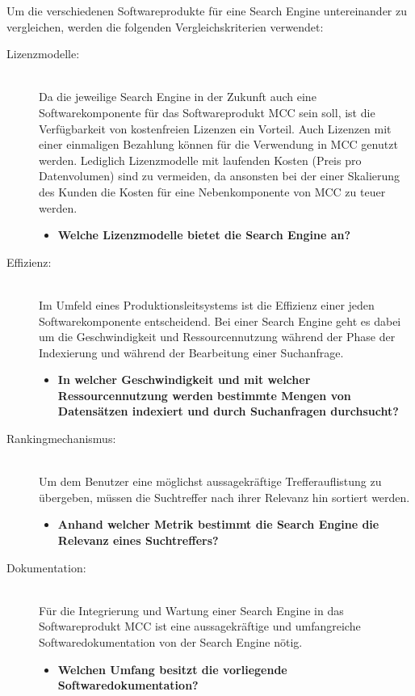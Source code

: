 Um die verschiedenen Softwareprodukte für eine Search Engine untereinander zu vergleichen, werden die folgenden Vergleichskriterien verwendet:

\begin{description}
    \item[Lizenzmodelle:]\hfill \\
    Da die jeweilige Search Engine in der Zukunft auch eine Softwarekomponente für das Softwareprodukt MCC sein soll, ist die Verfügbarkeit von kostenfreien Lizenzen ein Vorteil. Auch Lizenzen mit einer einmaligen Bezahlung können für die Verwendung in MCC genutzt werden. Lediglich Lizenzmodelle mit laufenden Kosten (Preis pro Datenvolumen) sind zu vermeiden, da ansonsten bei der einer Skalierung des Kunden die Kosten für eine Nebenkomponente von MCC zu teuer werden.
    
    \begin{itemize}
        \item \textbf{Welche Lizenzmodelle bietet die Search Engine an?}
    \end{itemize}

    \item[Effizienz:]\hfill \\
    Im Umfeld eines Produktionsleitsystems ist die Effizienz einer jeden Softwarekomponente entscheidend. Bei einer Search Engine geht es dabei um die Geschwindigkeit und Ressourcennutzung während der Phase der Indexierung und während der Bearbeitung einer Suchanfrage.

    \begin{itemize}
        \item \textbf{In welcher Geschwindigkeit und mit welcher Ressourcennutzung werden bestimmte Mengen von Datensätzen indexiert und durch Suchanfragen durchsucht?}
    \end{itemize}
    
    \item[Rankingmechanismus:]\hfill \\
    Um dem Benutzer eine möglichst aussagekräftige Trefferauflistung zu übergeben, müssen die Suchtreffer nach ihrer Relevanz hin sortiert werden.

    \begin{itemize}
        \item \textbf{Anhand welcher Metrik bestimmt die Search Engine die Relevanz eines Suchtreffers?}
    \end{itemize}

    \item[Dokumentation:]\hfill \\
    Für die Integrierung und Wartung einer Search Engine in das Softwareprodukt MCC ist eine aussagekräftige und umfangreiche Softwaredokumentation von der Search Engine nötig.

    \begin{itemize}
        \item \textbf{Welchen Umfang besitzt die vorliegende Softwaredokumentation?}
    \end{itemize}

\end{description}


